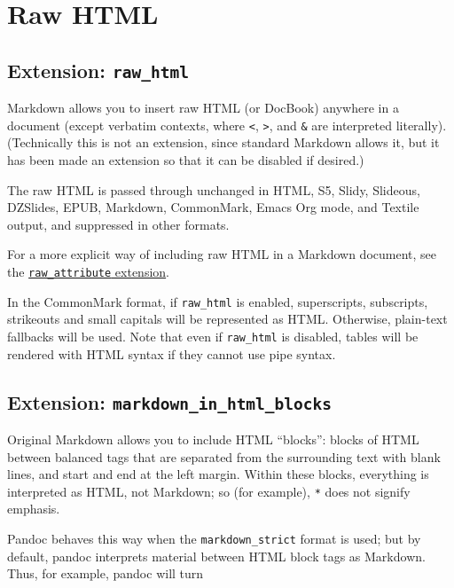 \documentclass[
  b5paper
]{book}
\begin{document}
\section{Raw HTML}\label{raw-html}

\subsection{\texorpdfstring{Extension:
\texttt{raw\_html}}{Extension: raw\_html}}\label{extension-raw_html}

Markdown allows you to insert raw HTML (or DocBook) anywhere in a
document (except verbatim contexts, where \texttt{\textless{}},
\texttt{\textgreater{}}, and \texttt{\&} are interpreted literally).
(Technically this is not an extension, since standard Markdown allows
it, but it has been made an extension so that it can be disabled if
desired.)

The raw HTML is passed through unchanged in HTML, S5, Slidy, Slideous,
DZSlides, EPUB, Markdown, CommonMark, Emacs Org mode, and Textile
output, and suppressed in other formats.

For a more explicit way of including raw HTML in a Markdown document,
see the \hyperref[extension-raw_attribute]{\texttt{raw\_attribute}
extension}.

In the CommonMark format, if \texttt{raw\_html} is enabled,
superscripts, subscripts, strikeouts and small capitals will be
represented as HTML. Otherwise, plain-text fallbacks will be used. Note
that even if \texttt{raw\_html} is disabled, tables will be rendered
with HTML syntax if they cannot use pipe syntax.

\subsection{\texorpdfstring{Extension:
\texttt{markdown\_in\_html\_blocks}}{Extension: markdown\_in\_html\_blocks}}\label{extension-markdown_in_html_blocks}

Original Markdown allows you to include HTML ``blocks'': blocks of HTML
between balanced tags that are separated from the surrounding text with
blank lines, and start and end at the left margin. Within these blocks,
everything is interpreted as HTML, not Markdown; so (for example),
\texttt{*} does not signify emphasis.

Pandoc behaves this way when the \texttt{markdown\_strict} format is
used; but by default, pandoc interprets material between HTML block tags
as Markdown. Thus, for example, pandoc will turn
\end{document}

